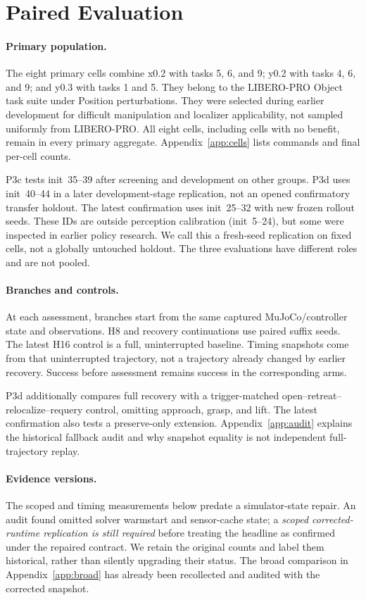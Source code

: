 \documentclass{article}
\begin{document}
\section{Paired Evaluation}
\label{sec:evaluation}
\paragraph{Primary population.}
The eight primary cells combine x0.2 with tasks 5, 6, and 9;
y0.2 with tasks 4, 6, and 9; and y0.3 with tasks 1 and 5.
They belong to the LIBERO-PRO Object task suite under Position perturbations.
They were selected during earlier development for difficult manipulation and
localizer applicability, not sampled uniformly from LIBERO-PRO.
All eight cells, including cells with no benefit, remain in every primary
aggregate. Appendix~\ref{app:cells} lists commands and final per-cell counts.

P3c tests init~35--39 after screening and development on other groups.
P3d uses init~40--44 in a later development-stage replication, not an
opened confirmatory transfer holdout. The latest confirmation uses init~25--32
with new frozen rollout seeds. These IDs are outside perception calibration
(init~5--24), but some were inspected in earlier policy research.
We call this a fresh-seed replication on fixed cells, not a globally untouched
holdout. The three evaluations have different roles and are not pooled.

\paragraph{Branches and controls.}
At each assessment, branches start from the same captured MuJoCo/controller
state and observations. H8 and recovery continuations use paired suffix seeds.
The latest H16 control is a full, uninterrupted baseline.
Timing snapshots come from that uninterrupted trajectory, not a trajectory
already changed by earlier recovery.
Success before assessment remains success in the corresponding arms.

P3d additionally compares full recovery with a trigger-matched
open--retreat--relocalize--requery control, omitting approach, grasp, and lift.
The latest confirmation also tests a preserve-only extension.
Appendix~\ref{app:audit} explains the historical fallback audit and why
snapshot equality is not independent full-trajectory replay.

\paragraph{Evidence versions.}
The scoped and timing measurements below predate a simulator-state repair.
An audit found omitted solver warmstart and sensor-cache state; a
\emph{scoped corrected-runtime replication is still required} before treating
the headline as confirmed under the repaired contract. We retain the original
counts and label them historical, rather than silently upgrading their status.
The broad comparison in Appendix~\ref{app:broad} has already been recollected
and audited with the corrected snapshot.
\end{document}
